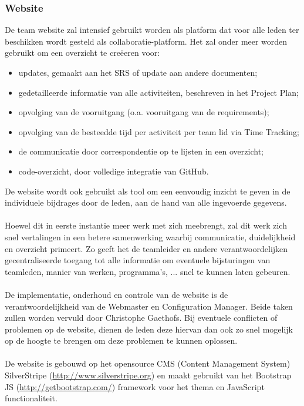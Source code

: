 \subsubsection{Website}
De team website zal intensief gebruikt worden als platform dat voor alle leden ter beschikken wordt gesteld als collaboratie-platform. Het zal onder meer worden gebruikt om een overzicht te cre\"{e}eren voor:
\begin{itemize}
 \item updates, gemaakt aan het SRS of update aan andere documenten;
 \item gedetailleerde informatie van alle activiteiten, beschreven in het Project Plan;
 \item opvolging van de vooruitgang (o.a. vooruitgang van de requirements);
 \item opvolging van de besteedde tijd per activiteit per team lid via Time Tracking;
 \item de communicatie door correspondentie op te lijsten in een overzicht;
 \item code-overzicht, door volledige integratie van GitHub. 
\end{itemize}

De website wordt ook gebruikt als tool om een eenvoudig inzicht te geven in de individuele bijdrages door de leden, aan de hand van alle ingevoerde gegevens. 
\\
\\
Hoewel dit in eerste instantie meer werk met zich meebrengt, zal dit werk zich snel vertalingen in een betere samenwerking waarbij communicatie, duidelijkheid en overzicht primeert. Zo geeft het de teamleider en andere verantwoordelijken gecentraliseerde toegang tot alle informatie om eventuele bijsturingen van teamleden, manier van werken, programma’s, ... snel te kunnen laten gebeuren.
\\
\\
De implementatie, onderhoud en controle van de website is de verantwoordelijkheid van de Webmaster en Configuration Manager. Beide taken zullen worden vervuld door Christophe Gaethofs. Bij eventuele conflicten of problemen op de website, dienen de leden deze hiervan dan ook zo snel mogelijk op de hoogte te brengen om deze problemen te kunnen oplossen.
\\
\\
De website is gebouwd op het opensource CMS (Content Management System) SilverStripe (\url{http://www.silverstripe.org}) en maakt gebruikt van het Bootstrap JS (\url{http://getbootstrap.com/}) framework voor het thema en JavaScript functionaliteit.

